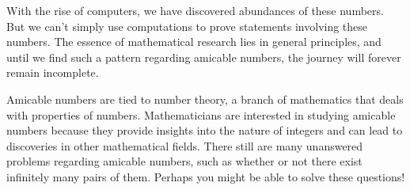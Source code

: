 \documentclass[12pt]{article}
\begin{document}
With the rise of computers, we have discovered abundances of these numbers. But we
can’t simply use computations to prove statements involving these numbers. The essence of
mathematical research lies in general principles, and until we find such a pattern regarding
amicable numbers, the journey will forever remain incomplete.

Amicable numbers are tied to number theory, a branch of mathematics that deals with
properties of numbers. Mathematicians are interested in studying amicable numbers because
they provide insights into the nature of integers and can lead to discoveries in other
mathematical fields. There still are many unanswered problems regarding amicable numbers,
such as whether or not there exist infinitely many pairs of them. Perhaps you might be able to
solve these questions!
\end{document}
